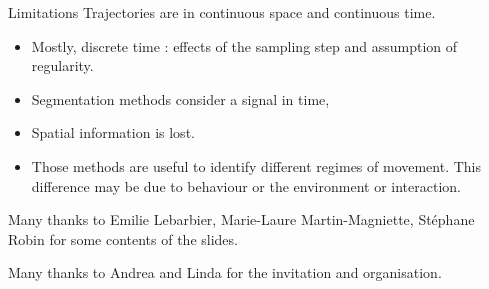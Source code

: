 \documentclass{beamer}\usepackage[]{graphicx}\usepackage[]{color}
\begin{document}
\begin{frame}{Limitations}
Trajectories are in continuous space and continuous time.
\begin{itemize}
\item Mostly, discrete time : effects of the sampling step and assumption of regularity.
\item Segmentation methods consider a signal in time,
\item Spatial information is lost.
\item Those methods are useful to identify different regimes of movement. This difference may be due to behaviour or the environment or interaction. 
\end{itemize}
\end{frame}

\begin{frame}
Many thanks to Emilie Lebarbier, Marie-Laure Martin-Magniette, Stéphane Robin for some contents of the slides.


\vspace{1cm}
Many thanks to Andrea and Linda for the invitation and organisation.

\end{frame}
\appendix
% 
\end{document}
